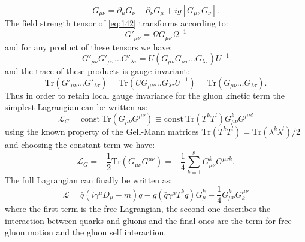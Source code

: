\begin{equation}
  \label{eq:142}
  G_{\mu\nu} = \partial_\mu G_\nu - \partial_\nu G_\mu + ig \left[ G_\mu, G_\nu \right].
\end{equation}
The field strength tensor of \cref{eq:142} transforms according to:
\begin{equation}
  \label{eq:144}
  G'_{\mu\nu} = \Omega G_{\mu\nu} \Omega^{-1}
\end{equation}
and for any product of these tensors we have:
\begin{equation}
  \label{eq:145}
  G'_{\mu\nu} G'_{\rho \sigma} \dots G'_{\lambda \tau} = U \left( G_{\mu\nu}
    G_{\rho \sigma} \dots G_{\lambda \tau} \right) U^{-1}
\end{equation}
and the trace of these products is gauge invariant:
\begin{equation}
  \label{eq:146}
  \mathrm{Tr}(G'_{\mu\nu} \dots G'_{\lambda \tau}) = \mathrm{Tr}(UG_{\mu\nu}
  \dots G_{\lambda \tau}U^{-1}) = \mathrm{Tr}(G_{\mu\nu} \dots G_{\lambda \tau}).
\end{equation}
Thus in order to retain local gauge invariance for the gluon kinetic term the
simplest Lagrangian can be written as:
\begin{equation}
  \label{eq:143}
  \mathcal{L}_G = \mathrm{const~Tr}(G_{\mu\nu} G^{\mu\nu}) \equiv
  \mathrm{const~}\mathrm{Tr}(T^k T^l) G_{\mu\nu}^k G^{\mu\nu l}
\end{equation}
using the known property of the Gell-Mann matrices $\mathrm{Tr}(T^k T^l) =
\mathrm{Tr}(\lambda^k \lambda^l)/2$ and choosing the constant term we have:
\begin{equation}
  \label{eq:147}
  \mathcal{L}_G = - \frac{1}{2} \mathrm{Tr}(G_{\mu\nu}G^{\mu\nu}) = -
  \frac{1}{4} \sum_{k = 1}^8 G_{\mu\nu}^k G^{\mu\nu k}.
\end{equation}
The full Lagrangian can finally be written as:
\begin{equation}
  \label{eq:148}
  \mathcal{L} = \bar{q} \left( i \gamma^\mu D_\mu - m \right) q - g \left(
    \bar{q} \gamma^\mu T^k q \right) G_\mu^k - \frac{1}{4}G_{\mu\nu}^k G_k^{\mu\nu}
\end{equation}
where the first term is the free Lagrangian, the second one describes the
interaction between quarks and gluons and the final ones are the term for free
gluon motion and the gluon self interaction.
